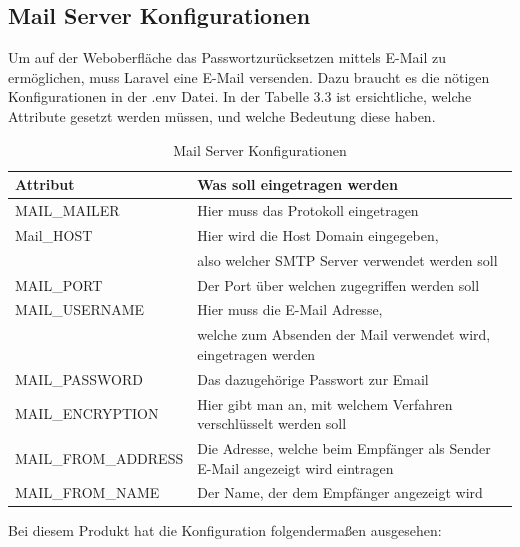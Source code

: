 \subsection{Mail Server Konfigurationen}
Um auf der Weboberfläche das Passwortzurücksetzen mittels E-Mail zu ermöglichen, muss Laravel eine E-Mail versenden. Dazu braucht es die nötigen Konfigurationen in der .env Datei. In der Tabelle 3.3 ist ersichtliche, welche Attribute gesetzt werden müssen, und welche Bedeutung diese haben.
\begin{table}[h]
	
	\begin{tabular}{|l|l|}
		\hline
		Attribut         & Was soll eingetragen werden                        \\ \hline
		MAIL\_MAILER     & Hier muss das Protokoll eingetragen                     \\ \hline
		Mail\_HOST          & Hier wird die Host Domain  eingegeben,\\&also welcher SMTP Server verwendet werden soll         \\ \hline
		MAIL\_PORT       & Der Port über welchen zugegriffen werden soll \\ \hline
		MAIL\_USERNAME      & Hier muss die E-Mail Adresse,\\& welche zum Absenden der Mail verwendet wird, eingetragen werden \\ \hline
		MAIL\_PASSWORD   & Das dazugehörige Passwort zur Email                \\ \hline
		MAIL\_ENCRYPTION    & Hier gibt man an, mit welchem Verfahren verschlüsselt werden soll                             \\ \hline
		MAIL\_FROM\_ADDRESS & Die Adresse, welche beim Empfänger als Sender E-Mail angezeigt wird  eintragen                 \\ \hline
		MAIL\_FROM\_NAME & Der Name, der dem Empfänger angezeigt wird    \\ \hline
	\end{tabular}
\caption{Mail Server Konfigurationen}
\label{sec: Mail Server Konfigurationen}
\end{table}
\newpage
Bei diesem Produkt hat die Konfiguration folgendermaßen ausgesehen:
